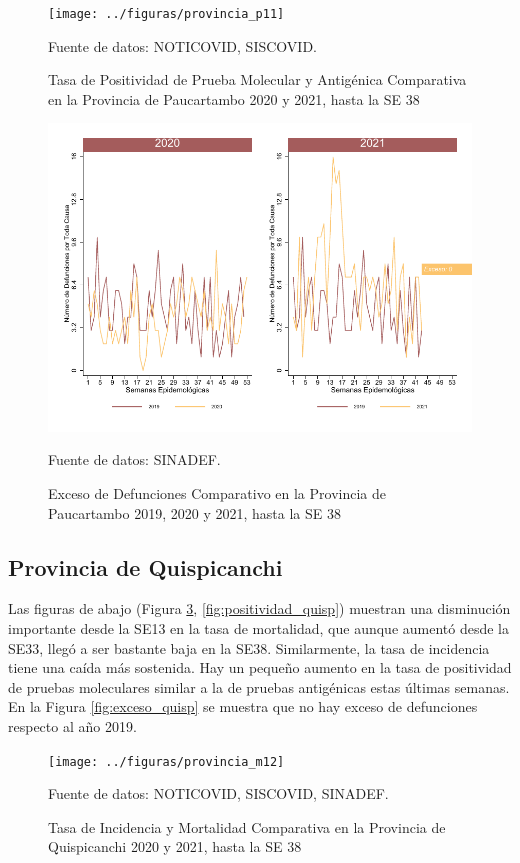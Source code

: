 \documentclass[12pt,a4paper,openany]{book}
\begin{document}
	\begin{figure}[h]
	\caption{Tasa de Positividad de Prueba Molecular y Antigénica Comparativa en la Provincia de Paucartambo 2020 y 2021, hasta la SE 38}\label{fig:positividad_paucartam}
	\begin{center}
		\texttt{[image: ../figuras/provincia\_p11]}
	\end{center}
	{\footnotesize {Fuente de datos: NOTICOVID, SISCOVID.}}
	\end{figure}

	\begin{figure}[h]
	\caption{Exceso de Defunciones Comparativo en la Provincia de Paucartambo 2019, 2020 y 2021, hasta la SE 38}\label{fig:exceso_paucartam}
	\begin{center}
		\includegraphics[width=0.7\linewidth]{../figuras/exceso_11}
	\end{center}
	{\footnotesize {Fuente de datos: SINADEF.}}
	\end{figure}

\clearpage

	\subsection*{Provincia de Quispicanchi}
	\noindent Las figuras de abajo (Figura \ref{fig:inc_mort_quisp}, \ref{fig:positividad_quisp})  muestran una disminución importante desde la SE13 en la tasa de mortalidad, que aunque aumentó desde la SE33, llegó a ser bastante baja en la SE38. Similarmente, la tasa de incidencia tiene una caída más sostenida. Hay un pequeño aumento en la tasa de positividad de pruebas moleculares similar a la de pruebas antigénicas estas últimas semanas. En la Figura \ref{fig:exceso_quisp} se muestra que no hay exceso de defunciones respecto al año 2019.

	\begin{figure}[h]
	\caption{Tasa de Incidencia y Mortalidad Comparativa en la Provincia de Quispicanchi 2020 y 2021, hasta la SE 38}\label{fig:inc_mort_quisp}
	\begin{center}
		\texttt{[image: ../figuras/provincia\_m12]}
	\end{center}
	{\footnotesize {Fuente de datos: NOTICOVID, SISCOVID, SINADEF.}}
	\end{figure}
\end{document}
